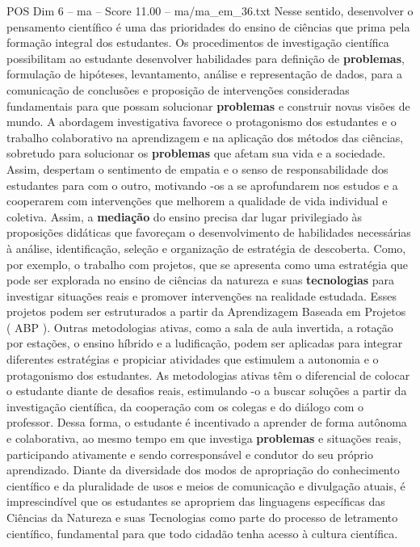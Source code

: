 \begin{textsample}{POS Dim 6 – ma – Score 11.00 – ma/ma\_em\_36.txt}
Nesse sentido, desenvolver o pensamento científico é uma das prioridades do ensino de ciências que prima pela formação integral dos estudantes.
Os procedimentos de investigação científica possibilitam ao estudante desenvolver habilidades para definição de \textbf{problemas}, formulação de hipóteses, levantamento, análise e representação de dados, para a comunicação de conclusões e proposição de intervenções consideradas fundamentais para que possam solucionar \textbf{problemas} e construir novas visões de mundo.
A abordagem investigativa favorece o protagonismo dos estudantes e o trabalho colaborativo na aprendizagem e na aplicação dos métodos das ciências, sobretudo para solucionar os \textbf{problemas} que afetam sua vida e a sociedade.
Assim, despertam o sentimento de empatia e o senso de responsabilidade dos estudantes para com o outro, motivando -os a se aprofundarem nos estudos e a cooperarem com intervenções que melhorem a qualidade de vida individual e coletiva.
Assim, a \textbf{mediação} do ensino precisa dar lugar privilegiado às proposições didáticas que favoreçam o desenvolvimento de habilidades necessárias à análise, identificação, seleção e organização de estratégia de descoberta.
Como, por exemplo, o trabalho com projetos, que se apresenta como uma estratégia que pode ser explorada no ensino de ciências da natureza e suas \textbf{tecnologias} para investigar situações reais e promover intervenções na realidade estudada.
Esses projetos podem ser estruturados a partir da Aprendizagem Baseada em Projetos ( ABP ).
Outras metodologias ativas, como a sala de aula invertida, a rotação por estações, o ensino híbrido e a ludificação, podem ser aplicadas para integrar diferentes estratégias e propiciar atividades que estimulem a autonomia e o protagonismo dos estudantes.
As metodologias ativas têm o diferencial de colocar o estudante diante de desafios reais, estimulando -o a buscar soluções a partir da investigação científica, da cooperação com os colegas e do diálogo com o professor.
Dessa forma, o estudante é incentivado a aprender de forma autônoma e colaborativa, ao mesmo tempo em que investiga \textbf{problemas} e situações reais, participando ativamente e sendo corresponsável e condutor do seu próprio aprendizado.
Diante da diversidade dos modos de apropriação do conhecimento científico e da pluralidade de usos e meios de comunicação e divulgação atuais, é imprescindível que os estudantes se apropriem das linguagens específicas das Ciências da Natureza e suas Tecnologias como parte do processo de letramento científico, fundamental para que todo cidadão tenha acesso à cultura científica.

\end{textsample}
